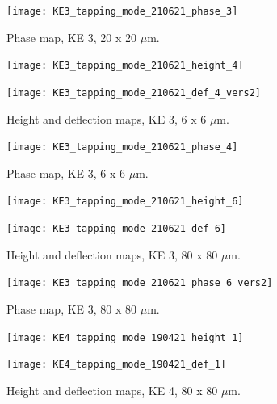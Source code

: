 \begin{figure}[H]
\centering
  \texttt{[image: KE3\_tapping\_mode\_210621\_phase\_3]}
\caption[Phase map, KE 3]{Phase map, KE 3, 20 x 20 $\mu$m.}
\label{fig:afm_ke3_phase_3}
\end{figure}


\begin{figure}[H]
\centering
\begin{minipage}{.45\textwidth}
  \centering
  \texttt{[image: KE3\_tapping\_mode\_210621\_height\_4]}
\end{minipage}
\begin{minipage}{.45\textwidth}
  \centering
  \texttt{[image: KE3\_tapping\_mode\_210621\_def\_4\_vers2]}
\end{minipage}
\caption[Height and deflection maps, KE 3]{Height and deflection maps, KE 3, 6 x 6 $\mu$m.}
\label{fig:afm_ke3_height_def_4}
\end{figure}

\begin{figure}[H]
\centering
  \texttt{[image: KE3\_tapping\_mode\_210621\_phase\_4]}
\caption[Phase map, KE 3]{Phase map, KE 3, 6 x 6 $\mu$m.}
\label{fig:afm_ke3_phase_4}
\end{figure}


\begin{figure}[H]
\centering
\begin{minipage}{.45\textwidth}
  \centering
  \texttt{[image: KE3\_tapping\_mode\_210621\_height\_6]}
\end{minipage}
\begin{minipage}{.45\textwidth}
  \centering
  \texttt{[image: KE3\_tapping\_mode\_210621\_def\_6]}
\end{minipage}
\caption[Height and deflection maps, KE 3]{Height and deflection maps, KE 3, 80 x 80 $\mu$m.}
\label{fig:afm_ke3_height_def_5}
\end{figure}

\begin{figure}[H]
\centering
  \texttt{[image: KE3\_tapping\_mode\_210621\_phase\_6\_vers2]}
\caption[Phase map, KE 3]{Phase map, KE 3, 80 x 80 $\mu$m.}
\label{fig:afm_ke3_phase_5}
\end{figure}



\begin{figure}[H]
\centering
\begin{minipage}{.45\textwidth}
  \centering
  \texttt{[image: KE4\_tapping\_mode\_190421\_height\_1]}
\end{minipage}
\begin{minipage}{.45\textwidth}
  \centering
  \texttt{[image: KE4\_tapping\_mode\_190421\_def\_1]}
\end{minipage}
\caption[Height and deflection maps, KE 4]{Height and deflection maps, KE 4, 80 x 80 $\mu$m.}
\label{fig:afm_ke4_height_def_1}
\end{figure}

